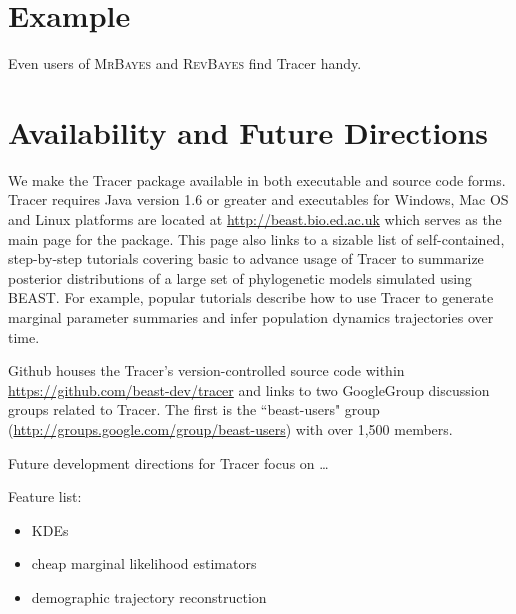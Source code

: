 \documentclass{bioinfo}
\begin{document}
\section*{Example}

Even users of \textsc{MrBayes} and \textsc{RevBayes} find Tracer handy.  

\section*{Availability and Future Directions}

We make the Tracer package available in both executable and source code forms.  Tracer requires Java version 1.6 or greater and executables for Windows, Mac OS and Linux platforms are located at \url{http://beast.bio.ed.ac.uk} which serves as the main page for the package. This page also links to a sizable list of self-contained, step-by-step tutorials covering basic to advance usage of Tracer to summarize posterior distributions of a large set of phylogenetic models simulated using BEAST.  For example, popular tutorials describe how to use Tracer to generate marginal parameter summaries and infer population dynamics trajectories over time.

Github houses the Tracer's version-controlled source code within \url{https://github.com/beast-dev/tracer} and links to two GoogleGroup discussion groups related to Tracer.  
The first is the ``beast-users" group (\url{http://groups.google.com/group/beast-users}) with over 1,500 members. 

Future development directions for Tracer focus on \ldots


Feature list:
\begin{itemize}
\item KDEs
\item cheap marginal likelihood estimators
\item demographic trajectory reconstruction
\end{itemize}


\end{document}
